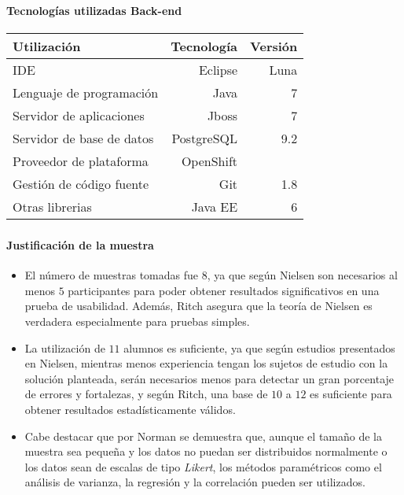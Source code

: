 \begin{frame}[noframenumbering]
\frametitle{\apendixframetitle}
\framesubtitle{Tecnologías utilizadas \- Back-end}
\begin{table}
\centering
\begin{tabular}{lrr}
\toprule
\textbf{Utilización} & \textbf{Tecnología}  & \textbf{Versión} \\
\midrule
IDE                         & Eclipse & Luna\\
Lenguaje de programación    & Java & 7\\
\midrule
Servidor de aplicaciones    & Jboss & 7 \\
Servidor de base de datos   & PostgreSQL & 9.2 \\
Proveedor de plataforma     & OpenShift \\
\midrule
Gestión de código fuente    & Git & 1.8\\
Otras librerias             & Java EE & 6\\

\bottomrule
\end{tabular}
\end{table}
\end{frame}

\begin{frame}[noframenumbering]
\frametitle{\apendixframetitle}
\framesubtitle{Justificación de la muestra}

\small

\begin{itemize}

\item El número de muestras tomadas fue 8, ya que según Nielsen son necesarios
    al menos $5$ participantes para poder obtener resultados significativos en
    una prueba de usabilidad. Además, Ritch asegura que la teoría de Nielsen es
    verdadera especialmente para pruebas simples. 

\item La utilización de $11$ alumnos es suficiente, ya que según estudios
    presentados en Nielsen, mientras menos experiencia tengan los sujetos de
    estudio con la solución planteada, serán necesarios menos para detectar un
    gran porcentaje de errores y fortalezas, y según Ritch, una base de $10$ a
    $12$ es suficiente para obtener resultados estadísticamente válidos.

\item Cabe destacar que por Norman se demuestra que, aunque el tamaño de la
    muestra sea pequeña y los datos no puedan ser distribuidos normalmente o los
    datos sean de escalas de tipo \textit{Likert}, los métodos paramétricos como
    el análisis de varianza, la regresión y la correlación pueden ser
    utilizados.

\end{itemize}
\end{frame}


